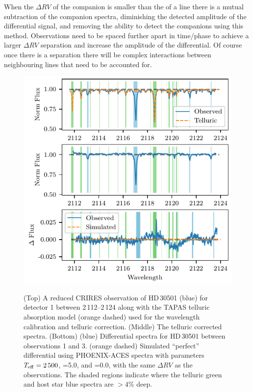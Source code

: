 When the \(\Delta {RV}\) of the companion is smaller than the {\fwhm} of a line there is a mutual subtraction of the companion spectra, diminishing the detected amplitude of the differential signal, and removing the ability to detect the companions using this method.
Observations need to be spaced further apart in time/phase to achieve a larger \(\Delta {RV}\) separation and increase the amplitude of the differential.
Of course once there is a separation there will be complex interactions between neighbouring lines that need to be accounted for.

\begin{figure}
    \centering
    \includegraphics[width=0.8\hsize]{figures/direct-recovery/differential.pdf}\\
    \caption{(Top) A reduced {CRIRES} observation of {HD\,30501} (blue) for detector 1 between 2\,112--2\,124\nm{} along with the {TAPAS} telluric absorption model ({orange} dashed) used for the wavelength calibration and telluric correction.
        (Middle) The telluric corrected spectra.
        (Bottom) ({blue}) Differential spectra for {HD\,30501} between observations 1 and 3. ({orange} dashed) Simulated ``perfect'' differential using {PHOENIX-ACES} spectra with parameters \(T_{\mathrm{eff}}{}=2\,500\)\K{}, \logg{}=5.0, and \feh{}=0.0, with the same \(\Delta {RV}\) as the observations.
        The shaded regions indicate where the telluric {green} and host star {blue} spectra are \(> 4\%\) deep.}
    \label{fig:spectral_example}
\end{figure}


